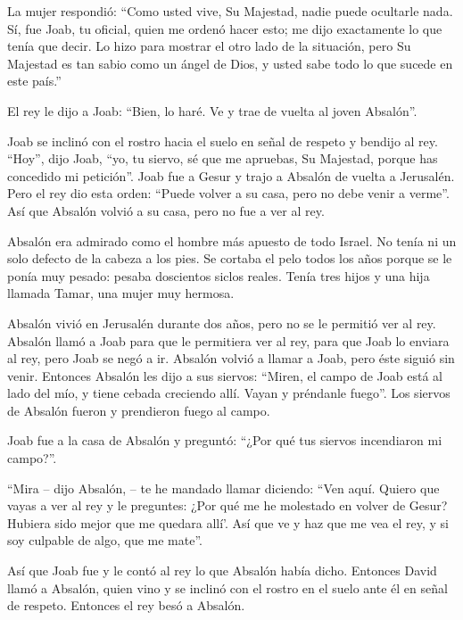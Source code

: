 La mujer respondió: ``Como usted vive, Su Majestad, nadie puede
ocultarle nada. Sí, fue Joab, tu oficial, quien me ordenó hacer esto; me
dijo exactamente lo que tenía que decir.  Lo hizo para
mostrar el otro lado de la situación, pero Su Majestad es tan sabio como
un ángel de Dios, y usted sabe todo lo que sucede en este país.''

 El rey le dijo a Joab: ``Bien, lo haré. Ve y trae de
vuelta al joven Absalón''.

 Joab se inclinó con el rostro hacia el suelo en señal de
respeto y bendijo al rey. ``Hoy'', dijo Joab, ``yo, tu siervo, sé que me
apruebas, Su Majestad, porque has concedido mi petición''. 
Joab fue a Gesur y trajo a Absalón de vuelta a Jerusalén. 
Pero el rey dio esta orden: ``Puede volver a su casa, pero no debe venir
a verme''. Así que Absalón volvió a su casa, pero no fue a ver al rey.

 Absalón era admirado como el hombre más apuesto de todo
Israel. No tenía ni un solo defecto de la cabeza a los pies.
 Se cortaba el pelo todos los años porque se le ponía muy
pesado: pesaba doscientos siclos reales.  Tenía tres hijos
y una hija llamada Tamar, una mujer muy hermosa.

 Absalón vivió en Jerusalén durante dos años, pero no se le
permitió ver al rey.  Absalón llamó a Joab para que le
permitiera ver al rey, para que Joab lo enviara al rey, pero Joab se
negó a ir. Absalón volvió a llamar a Joab, pero éste siguió sin venir.
 Entonces Absalón les dijo a sus siervos: ``Miren, el campo
de Joab está al lado del mío, y tiene cebada creciendo allí. Vayan y
préndanle fuego''. Los siervos de Absalón fueron y prendieron fuego al
campo.

 Joab fue a la casa de Absalón y preguntó: ``¿Por qué tus
siervos incendiaron mi campo?''.

 ``Mira -- dijo Absalón, -- te he mandado llamar diciendo:
``Ven aquí. Quiero que vayas a ver al rey y le preguntes: ¿Por qué me he
molestado en volver de Gesur? Hubiera sido mejor que me quedara allí'.
Así que ve y haz que me vea el rey, y si soy culpable de algo, que me
mate''.

 Así que Joab fue y le contó al rey lo que Absalón había
dicho. Entonces David llamó a Absalón, quien vino y se inclinó con el
rostro en el suelo ante él en señal de respeto. Entonces el rey besó a
Absalón.

